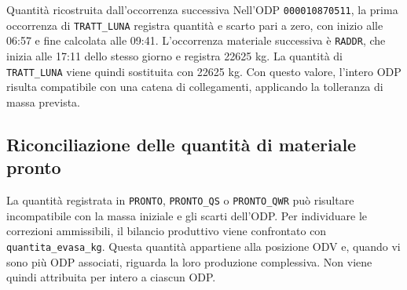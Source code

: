 \begingroup
{}
\begin{examplebox}{Quantità ricostruita dall'occorrenza successiva}
Nell'ODP \texttt{000010870511}, la prima occorrenza di \texttt{TRATT\_LUNA} registra quantità e scarto pari a zero, con inizio alle 06:57 e fine calcolata alle 09:41. L'occorrenza materiale successiva è \texttt{RADDR}, che inizia alle 17:11 dello stesso giorno e registra \num{22625} kg. La quantità di \texttt{TRATT\_LUNA} viene quindi sostituita con \num{22625} kg. Con questo valore, l'intero ODP risulta compatibile con una catena di collegamenti, applicando la tolleranza di massa prevista.
\end{examplebox}
\endgroup

\subsection{Riconciliazione delle quantità di materiale pronto}
\label{sec:ready-quantity-reconciliation}

La quantità registrata in \texttt{PRONTO}, \texttt{PRONTO\_QS} o \texttt{PRONTO\_QWR} può risultare incompatibile con la massa iniziale e gli scarti dell'ODP. Per individuare le correzioni ammissibili, il bilancio produttivo viene confrontato con \texttt{quantita\_evasa\_kg}. Questa quantità appartiene alla posizione ODV e, quando vi sono più ODP associati, riguarda la loro produzione complessiva. Non viene quindi attribuita per intero a ciascun ODP.

